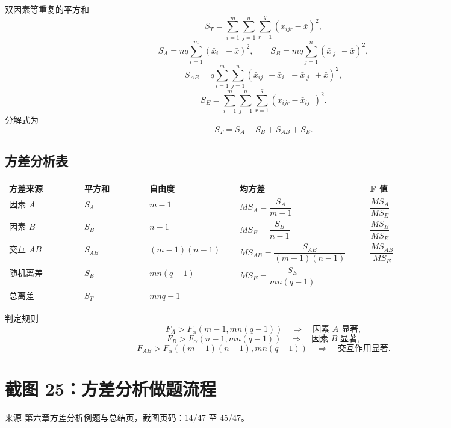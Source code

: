 \documentclass[UTF8,zihao=-4,fontset=fandol]{ctexart}
\begin{document}
\begin{keybox}{双因素等重复的平方和}
\[
S_T=\sum_{i=1}^{m}\sum_{j=1}^{n}\sum_{r=1}^{q}(x_{ijr}-\bar{x})^2,
\]
\[
S_A=nq\sum_{i=1}^{m}(\bar{x}_{i\cdot\cdot}-\bar{x})^2,
\qquad
S_B=mq\sum_{j=1}^{n}(\bar{x}_{\cdot j\cdot}-\bar{x})^2,
\]
\[
S_{AB}=q\sum_{i=1}^{m}\sum_{j=1}^{n}
(\bar{x}_{ij\cdot}-\bar{x}_{i\cdot\cdot}-\bar{x}_{\cdot j\cdot}+\bar{x})^2,
\]
\[
S_E=\sum_{i=1}^{m}\sum_{j=1}^{n}\sum_{r=1}^{q}
(x_{ijr}-\bar{x}_{ij\cdot})^2.
\]
分解式为
\[
S_T=S_A+S_B+S_{AB}+S_E.
\]
\end{keybox}

\subsection{方差分析表}

\begin{longtable}{@{}p{0.15\linewidth}p{0.13\linewidth}p{0.18\linewidth}p{0.26\linewidth}p{0.16\linewidth}@{}}
\toprule
\textbf{方差来源} & \textbf{平方和} & \textbf{自由度} & \textbf{均方差} & \textbf{F 值} \\
\midrule
因素 $A$ & $S_A$ & $m-1$ & $MS_A=\dfrac{S_A}{m-1}$ & $\dfrac{MS_A}{MS_E}$ \\
因素 $B$ & $S_B$ & $n-1$ & $MS_B=\dfrac{S_B}{n-1}$ & $\dfrac{MS_B}{MS_E}$ \\
交互 $AB$ & $S_{AB}$ & $(m-1)(n-1)$ & $MS_{AB}=\dfrac{S_{AB}}{(m-1)(n-1)}$ & $\dfrac{MS_{AB}}{MS_E}$ \\
随机离差 & $S_E$ & $mn(q-1)$ & $MS_E=\dfrac{S_E}{mn(q-1)}$ & \\
总离差 & $S_T$ & $mnq-1$ & & \\
\bottomrule
\end{longtable}

\begin{methodbox}{判定规则}
\[
F_A>F_{\alpha}(m-1,mn(q-1))\quad \Rightarrow \quad \text{因素 }A\text{ 显著},
\]
\[
F_B>F_{\alpha}(n-1,mn(q-1))\quad \Rightarrow \quad \text{因素 }B\text{ 显著},
\]
\[
F_{AB}>F_{\alpha}((m-1)(n-1),mn(q-1))
\quad \Rightarrow \quad
\text{交互作用显著}.
\]
\end{methodbox}

\section{截图 25：方差分析做题流程}

\begin{sourcebox}{来源}
第六章方差分析例题与总结页，截图页码：14/47 至 45/47。
\end{sourcebox}
\end{document}
